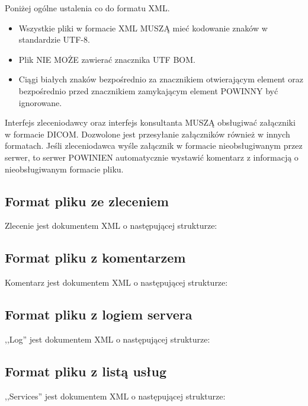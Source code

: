 \documentclass[a4paper]{article}
\begin{document}
Poniżej ogólne ustalenia co do formatu XML.
\begin{itemize}
  \item Wszystkie pliki w formacie XML MUSZĄ mieć kodowanie znaków w standardzie UTF-8.
  \item Plik NIE MOŻE zawierać znacznika UTF BOM.
  \item Ciągi białych znaków bezpośrednio za znacznikiem otwierającym element oraz
  bezpośrednio przed znacznikiem zamykającym element POWINNY być ignorowane. 
\end{itemize}
 
Interfejs zleceniodawcy oraz interfejs konsultanta MUSZĄ obsługiwać załączniki w formacie
DICOM. Dozwolone jest przesyłanie załączników również w innych formatach. Jeśli
zleceniodawca wyśle załącznik w formacie nieobsługiwanym przez serwer, to serwer POWINIEN
automatycznie wystawić komentarz z informacją o nieobsługiwanym formacie pliku.

\subsection{Format pliku ze zleceniem}

Zlecenie jest dokumentem XML o następującej strukturze:



\subsection{Format pliku z komentarzem}

Komentarz jest dokumentem XML o następującej strukturze:



\subsection{Format pliku z logiem servera}

,,Log'' jest dokumentem XML o następującej strukturze:



\subsection{Format pliku z listą usług}

,,Services'' jest dokumentem XML o następującej strukturze:


\end{document}
